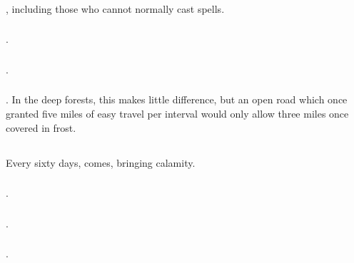 \begin{multicols}{2}
\toggletrue{genExamples}
\weatherChart

\subsubsection{}
, including those who cannot normally cast spells.

\subsubsection{}
.

\subsubsection{}
.

\subsubsection{}
.
In the deep forests, this makes little difference, but an open road which once granted five miles of easy travel per \gls{interval} would only allow three miles once covered in frost.

\subsection{}

Every sixty days,  comes, bringing calamity.

\subsubsection{}
.

\subsubsection{}
.

\subsubsection{}
.


\end{multicols}
